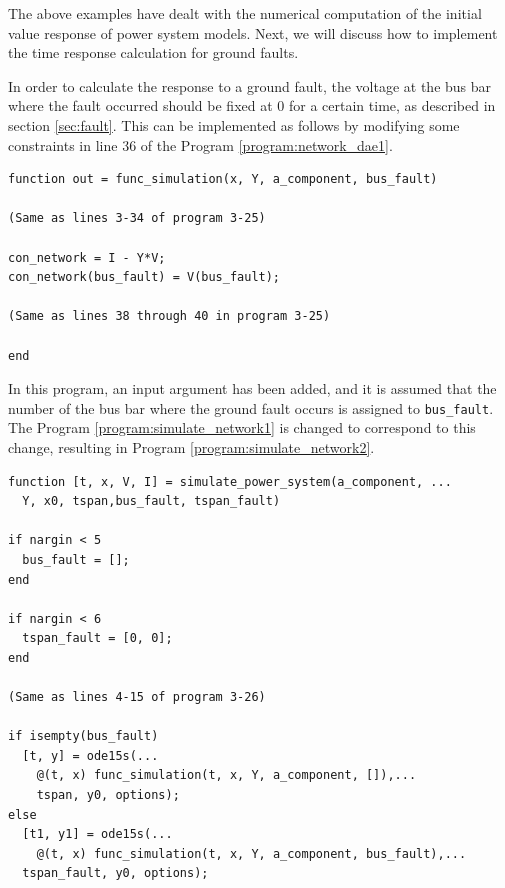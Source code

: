 \documentclass[graybox, envcountchap]{svmult}
\begin{document}
The above examples have dealt with the numerical computation of the initial value response of power system models.
Next, we will discuss how to implement the time response calculation for ground faults.

\begin{example}
In order to calculate the response to a ground fault, the voltage at the bus bar where the fault occurred should be fixed at $0$ for a certain time, as described in section \ref{sec:fault}.
This can be implemented as follows by modifying some constraints in line 36 of the Program \nobreak\ref{program:network_dae1}.

\smallskip
\begin{PROGRAMA}[count,title={func\_simulation.m}]\label{program:network_dae_fault}
\begin{verbatim}
function out = func_simulation(x, Y, a_component, bus_fault)

(Same as lines 3-34 of program 3-25)

con_network = I - Y*V;
con_network(bus_fault) = V(bus_fault);

(Same as lines 38 through 40 in program 3-25)

end
\end{verbatim}
\end{PROGRAMA}

In this program, an input argument has been added, and it is assumed that the number of the bus bar where the ground fault occurs is assigned to \verb|bus_fault|.
The Program \nobreak\ref{program:simulate_network1} is changed to correspond to this change, resulting in Program \ref{program:simulate_network2}.

\smallskip
\begin{PROGRAMA}[count,title={simulate\_power\_system.m}]\label{program:simulate_network2}
  \begin{verbatim}
function [t, x, V, I] = simulate_power_system(a_component, ...
  Y, x0, tspan,bus_fault, tspan_fault)

if nargin < 5
  bus_fault = [];
end

if nargin < 6
  tspan_fault = [0, 0];
end

(Same as lines 4-15 of program 3-26)

if isempty(bus_fault)
  [t, y] = ode15s(...
    @(t, x) func_simulation(t, x, Y, a_component, []),...
    tspan, y0, options);
else
  [t1, y1] = ode15s(...
    @(t, x) func_simulation(t, x, Y, a_component, bus_fault),...
  tspan_fault, y0, options);
  

\end{verbatim}
\end{PROGRAMA}
\end{example}
\end{document}
